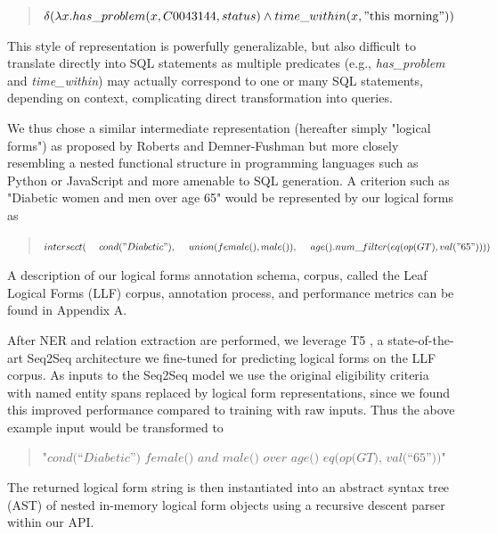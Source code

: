 \documentclass[../main.tex]{subfiles}
\begin{document}
\begin{quote}
    \centering
    $\delta( \lambda x.has\_problem(x, C0043144, status) \wedge time\_within(x, \mathrm{"this\ morning"}))$
\end{quote}

\noindent This style of representation is powerfully generalizable, but also difficult to translate directly into SQL statements as multiple predicates (e.g., \textit{has\_problem} and \textit{time\_within}) may actually correspond to one or many SQL statements, depending on context, complicating direct transformation into queries.

We thus chose a similar intermediate representation (hereafter simply "logical forms") as proposed by Roberts and Demner-Fushman but more closely resembling a nested functional structure in programming languages such as Python or JavaScript and more amenable to SQL generation. A criterion such as "Diabetic women and men over age 65" would be represented by our logical forms as

\begin{quote}
$intersect( \\
    \mathrm{\ \ \ \ }cond("Diabetic"), \\
    \mathrm{\ \ \ \ }union(female(), male()),\\
    \mathrm{\ \ \ \ }age().num\_filter(eq(op(GT), val("65"))) \\
)$
\end{quote}

\noindent A description of our logical forms annotation schema, corpus, called the Leaf Logical Forms (LLF) corpus, annotation process, and performance metrics can be found in Appendix A.

After NER and relation extraction are performed, we leverage T5 \cite{raffel2020exploring}, a state-of-the-art Seq2Seq architecture we fine-tuned for predicting logical forms on the LLF corpus. As inputs to the Seq2Seq model we use the original eligibility criteria with named entity spans replaced by logical form representations, since we found this improved performance compared to training with raw inputs. Thus the above example input would be transformed to

\begin{quote}
    \centering
    $\textit{"cond(“Diabetic”) female() and male() over age() eq(op(GT), val(“65”))"}$
\end{quote}

\noindent The returned logical form string is then instantiated into an abstract syntax tree (AST) of nested in-memory logical form objects using a recursive descent parser \cite{johnstone1998generalised} within our API.
\end{document}
